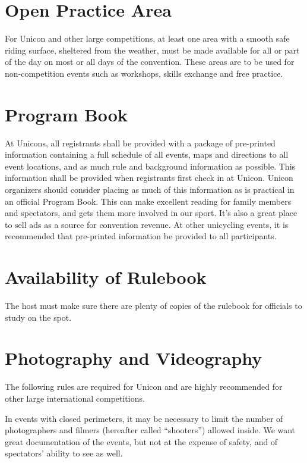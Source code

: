 \section{Open Practice Area}
For Unicon and other large competitions, at least one area with a smooth safe riding surface, sheltered from the weather, must be made available for all or part of the day on most or all days of the convention.
These areas are to be used for non-competition events such as workshops, skills exchange and free practice.

\section{Program Book}

At Unicons, all registrants shall be provided with a package of pre-printed information containing a full schedule of all events, maps and directions to all event locations, and as much rule and background information as possible.
This information shall be provided when registrants first check in at Unicon.
Unicon organizers should consider placing as much of this information as is practical in an official Program Book.
This can make excellent reading for family members and spectators, and gets them more involved in our sport.
It's also a great place to sell ads as a source for convention revenue.
At other unicycling events, it is recommended that pre-printed information be provided to all participants.

\section{Availability of Rulebook}
The host must make sure there are plenty of copies of the rulebook for officials to study on the spot.

\section{Photography and Videography}
The following rules are required for Unicon and are highly recommended for other large international competitions.

In events with closed perimeters, it may be necessary to limit the number of photographers and filmers (hereafter called ``shooters'') allowed inside.
We want great documentation of the events, but not at the expense of safety, and of spectators' ability to see as well.

